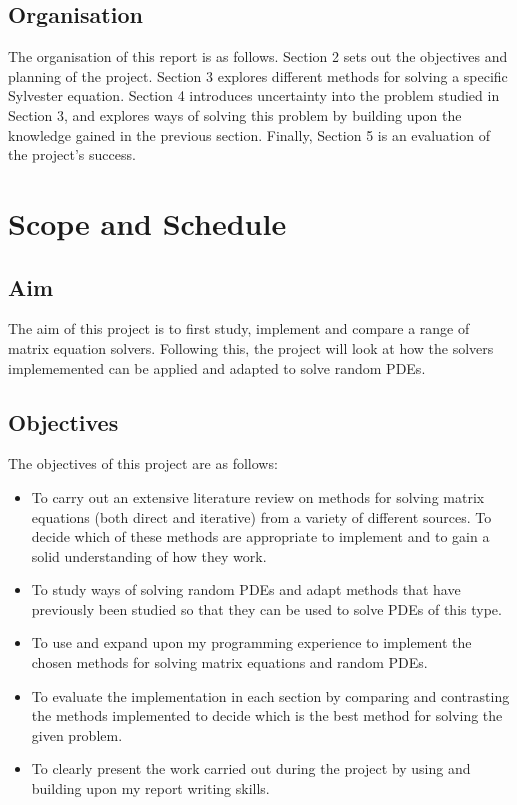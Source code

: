 \documentclass[11pt]{article}
\numberwithin{equation}{section}
\begin{document}
\subsection{Organisation}
The organisation of this report is as follows. Section 2 sets out the objectives and planning of the project. Section 3 explores different methods for solving a specific Sylvester equation. Section 4 introduces uncertainty into the problem studied in Section 3, and explores ways of solving this problem by building upon the knowledge gained in the previous section. Finally, Section 5 is an evaluation of the project's success.

\newpage

\section{Scope and Schedule}
\subsection{Aim}
The aim of this project is to first study, implement and compare a range of matrix equation solvers. Following this, the project will look at how the solvers implememented can be applied and adapted to solve random PDEs.

\subsection{Objectives}
The objectives of this project are as follows:
\begin{itemize}
\item To carry out an extensive literature review on methods for solving matrix equations (both direct and iterative) from a variety of different sources. To decide which of these methods are appropriate to implement and to gain a solid understanding of how they work.
\item To study ways of solving random PDEs and adapt methods that have previously been studied so that they can be used to solve PDEs of this type. 
\item To use and expand upon my programming experience to implement the chosen methods for solving matrix equations and random PDEs. 
\item To evaluate the implementation in each section by comparing and contrasting the methods implemented to decide which is the best method for solving the given problem.
\item To clearly present the work carried out during the project by using and building upon my report writing skills.
\end{itemize}
\end{document}
